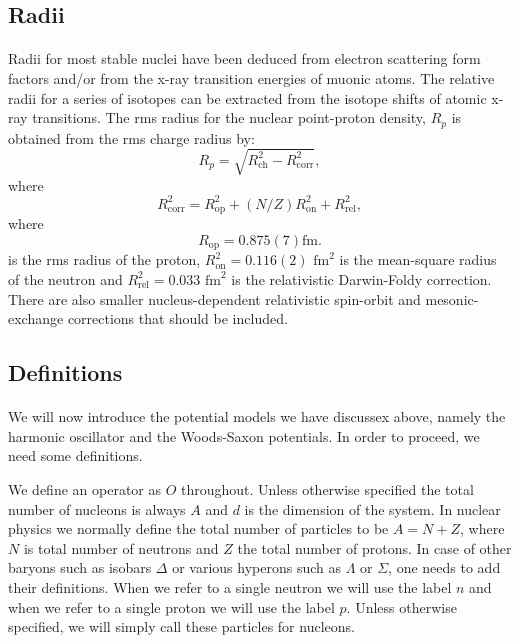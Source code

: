 \documentclass[%
twoside,                 %
final,                   %
10pt]{article}
\begin{document}
\subsection*{Radii}

\paragraph{}
Radii for most stable
nuclei have been deduced from electron scattering form
factors and/or from the x-ray transition energies of muonic atoms. 
The relative radii for a
series of isotopes can be extracted from the isotope shifts of atomic x-ray transitions.
The rms radius for the nuclear point-proton density, $R_p$ is obtained from the rms charge radius by:
\[
R_p = \sqrt{R^2_{\mathrm{ch}}- R^2_{\mathrm{corr}}},
\]
where
\[
R^2_{\mathrm{corr}}= R^2_{\mathrm{op}}+(N/Z)R^2_{\mathrm{on}}+R^2_{\mathrm{rel}},
\]
where 
\[
R_{\mathrm{op}}= 0.875(7) \mathrm{fm}.
\]
is the rms radius of the proton, $R^2_{\mathrm{on}} = 0.116(2)$ $\mbox{fm}^{2}$ is the
mean-square radius of the neutron and $R^2_{\mathrm{rel}} = 0.033$ $\mbox{fm}^{2}$ is the relativistic Darwin-Foldy correction. There are also smaller nucleus-dependent relativistic spin-orbit and
mesonic-exchange corrections that should be included.









\subsection*{Definitions}

\paragraph{}
We will now introduce the potential models we have discussex above, namely the harmonic oscillator and the Woods-Saxon potentials.  In order to proceed, we need some definitions.

We define an operator as $\hat{O}$ throughout. Unless otherwise specified the total number of nucleons is
always $A$ and $d$ is the dimension of the system.  In nuclear physics
we normally define the total number of particles to be $A=N+Z$, where
$N$ is total number of neutrons and $Z$ the total number of
protons. In case of other baryons such as isobars $\Delta$ or various
hyperons such as $\Lambda$ or $\Sigma$, one needs to add their
definitions.  When we refer to a single neutron we will use the label $n$ and when we refer to a single proton we will use the label $p$. Unless otherwise specified, we will simply call these particles for nucleons.
\end{document}
